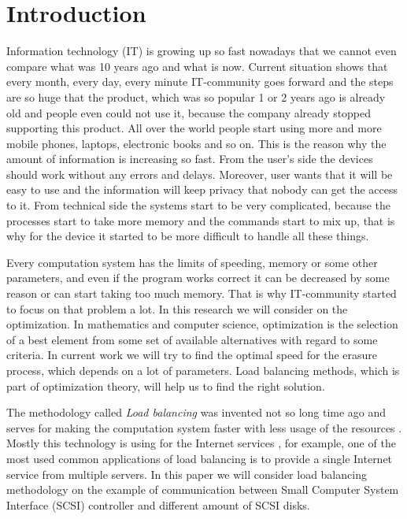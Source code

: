 \chapter{Introduction}
\label{chap1:title}

Information technology (IT) is growing up so fast nowadays that we cannot even compare what was 10 years ago and what is now. Current situation shows that every month, every day, every minute IT-community goes forward and the steps are so huge that the product, which was so popular 1 or 2 years ago is already old and people even could not use it, because the company already stopped supporting this product. All over the world people start using more and more mobile phones, laptops, electronic books and so on. This is the reason why the amount of information is increasing so fast. From the user’s side the devices should work without any errors and delays. Moreover, user wants that it will be easy to use and the information will keep privacy that nobody can get the access to it. From technical side the systems start to be very complicated, because the processes start to take more memory and the commands start to mix up, that is why for the device it started to be more difficult to handle all these things. 

Every computation system has the limits of speeding, memory or some other parameters, and even if the program works correct it can be decreased by some reason or can start taking too much memory. That is why IT-community started to focus on that problem a lot. In this research we will consider on the optimization. In mathematics and computer science, optimization is the selection of a best element from some set of available alternatives with regard to some criteria. In current work we will try to find the optimal speed for the erasure process, which depends on a lot of parameters. Load balancing methods, which is part of optimization theory, will help us to find the right solution.

The methodology called \emph{Load balancing} was invented not so long time ago and serves for making the computation system faster with less usage of the resources \cite{load_bal}. Mostly this technology is using for the Internet services \cite{dyn_bal_web}, for example, one of the most used common applications of load balancing is to provide a single Internet service from multiple servers. In this paper we will consider load balancing methodology on the example of communication between Small Computer System Interface (SCSI) controller and different amount of SCSI disks. 

